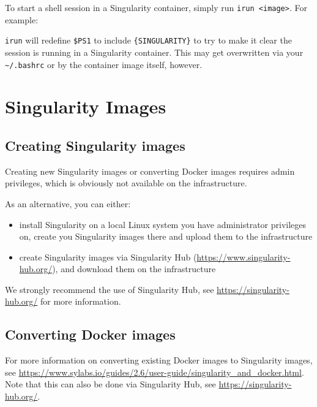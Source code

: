 To start a shell session in a Singularity container, simply run \lstinline|irun <image>|.
For example:


\lstinline|irun| will redefine \lstinline|$PS1| to include \lstinline|{SINGULARITY}|
to try to make it clear the session is running in a Singularity container.
This may get overwritten via your \lstinline|~/.bashrc| or by the container image itself, however.

\section{Singularity Images}

\subsection{Creating Singularity images}

Creating new Singularity images or converting Docker images requires admin privileges,
which is obviously not available on the \hpcInfra infrastructure.

As an alternative, you can either:

\begin{itemize}
    \item install Singularity on a local Linux system you have administrator privileges on,
        create you Singularity images there and upload them to the \hpcInfra infrastructure
    \item create Singularity images via Singularity Hub (\url{https://www.singularity-hub.org/}),
        and download them on the \hpcInfra infrastructure
\end{itemize}

We strongly recommend the use of Singularity Hub, see \url{https://singularity-hub.org/} for more information.

\subsection{Converting Docker images}

For more information on converting existing Docker images to Singularity images,
see \url{https://www.sylabs.io/guides/2.6/user-guide/singularity_and_docker.html}.
Note that this can also be done via Singularity Hub, see \url{https://singularity-hub.org/}.

